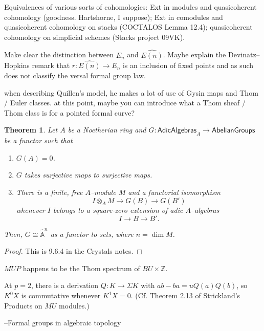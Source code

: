 \documentclass[12pt]{book}
\newcommand{\Z}{\mathbb Z}
\newcommand{\A}{\widehat{\mathbb{A}}}
\newcommand{\<}{\langle}
\renewcommand{\>}{\rangle}
\newcommand{\Susp}{\Sigma}
\newcommand{\CatOf}[1]{\mathsf{#1}}
\numberwithin{equation}{section}
\theoremstyle{plain}
\newtheorem{theorem}[equation]{Theorem}
\theoremstyle{definition}
\theoremstyle{remark}
\begin{document}
Equivalences of various sorts of cohomologies: Ext in modules and quasicoherent cohomology (goodness. Hartshorne, I suppose); Ext in comodules and quasicoherent cohomology on stacks (COCTALOS Lemma 12.4); quasicoherent cohomology on simplicial schemes (Stacks project 09VK).

Make clear the distinction between $E_n$ and $\widehat{E(n)}$. Maybe explain the Devinatz--Hopkins remark that $r: \widehat{E(n)} \to E_n$ is an inclusion of fixed points and as such does not classify the versal formal group law.


when describing Quillen's model, he makes a lot of use of Gysin maps and Thom / Euler classes. at this point, maybe you can introduce what a Thom sheaf / Thom class is for a pointed formal curve?




\begin{theorem}\label{DetectingFormalVarieties}
Let $A$ be a Noetherian ring and $G: \CatOf{AdicAlgebras}_A \to \CatOf{AbelianGroups}$ be a functor such that
\begin{enumerate}
\item $G(A) = 0$.
\item $G$ takes surjective maps to surjective maps.
\item There is a finite, free $A$--module $M$ and a functorial isomorphism \[I \otimes_A M \to G(B) \to G(B')\] whenever $I$ belongs to a square-zero extension of adic $A$--algebras \[I \to B \to B'.\]
\end{enumerate}
Then, $G \cong \A^n$ as a functor to sets, where $n = \dim M$.
\end{theorem}
\begin{proof}
This is 9.6.4 in the Crystals notes.
\end{proof}



$MUP$ happens to be the Thom spectrum of $BU \times \Z$.



At $p = 2$, there is a derivation $Q: K \to \Susp K$ with $ab - ba = u Q(a) Q(b)$, so $K^0 X$ is commutative whenever $K^1 X = 0$. (Cf. Theorem 2.13 of Strickland's Products on $MU$ modules.)






--Formal groups in algebraic topology
\end{document}
